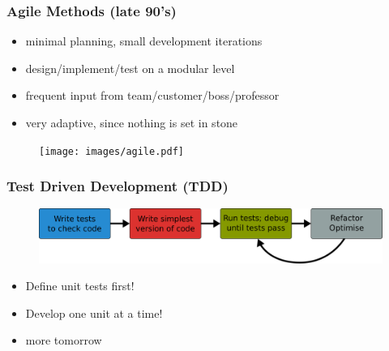 \documentclass{beamer}
\begin{document}
\begin{frame}
 \frametitle{Agile Methods (late 90's)}

\begin{itemize}
  \item minimal planning, small development iterations
  \item design/implement/test on a modular level
  \item frequent input from team/customer/boss/professor
  \item very adaptive, since nothing is set in stone
\end{itemize}

\begin{figure}
    \texttt{[image: images/agile.pdf]}
\end{figure}

\end{frame}


\begin{frame}
\frametitle{Test Driven Development (TDD)}

\begin{figure}
    \includegraphics[width=1\textwidth]{images/testdriven.pdf}
\end{figure}

\begin{itemize}
  \item Define unit tests first!
  \item Develop one unit at a time!
\end{itemize}
  
\begin{itemize}
  \item more tomorrow
\end{itemize}

\end{frame}

\end{document}
